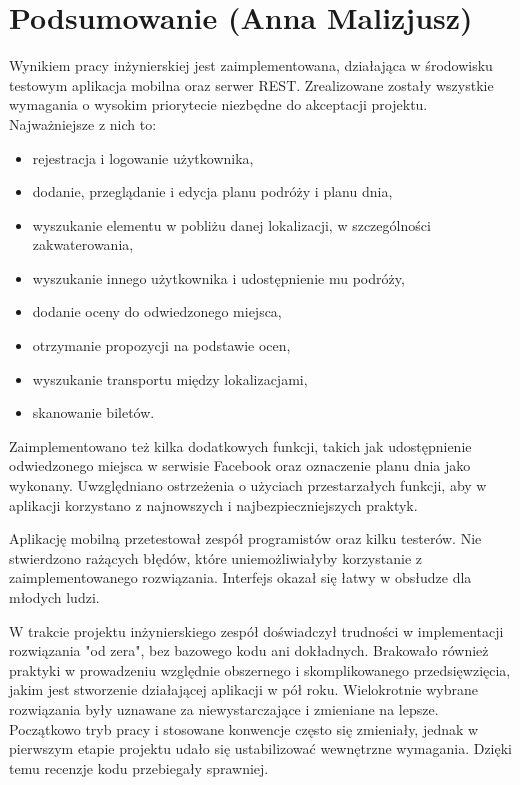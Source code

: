 \documentclass[10pt,twoside,a4paper]{report}
\begin{document}
\chapter{Podsumowanie (Anna Malizjusz)}

\par Wynikiem pracy inżynierskiej jest zaimplementowana, działająca w środowisku testowym aplikacja mobilna oraz serwer REST. Zrealizowane zostały wszystkie wymagania o wysokim priorytecie niezbędne do akceptacji projektu. Najważniejsze z nich to:
\begin{itemize}
\item rejestracja i logowanie użytkownika,
\item dodanie, przeglądanie i edycja planu podróży i planu dnia,
\item wyszukanie elementu w pobliżu danej lokalizacji, w szczególności zakwaterowania,
\item wyszukanie innego użytkownika i udostępnienie mu podróży,
\item dodanie oceny do odwiedzonego miejsca,
\item otrzymanie propozycji na podstawie ocen,
\item wyszukanie transportu między lokalizacjami,
\item skanowanie biletów.
\end{itemize}

\par Zaimplementowano też kilka dodatkowych funkcji, takich jak udostępnienie odwiedzonego miejsca w serwisie Facebook oraz oznaczenie planu dnia jako wykonany. Uwzględniano ostrzeżenia o użyciach przestarzałych funkcji, aby w aplikacji korzystano z najnowszych i najbezpieczniejszych praktyk.

\par Aplikację mobilną przetestował zespół programistów oraz kilku testerów. Nie stwierdzono rażących błędów, które uniemożliwiałyby korzystanie z zaimplementowanego rozwiązania. Interfejs okazał się łatwy w obsłudze dla młodych ludzi.

\par W trakcie projektu inżynierskiego zespół doświadczył trudności w implementacji rozwiązania "od zera", bez bazowego kodu ani dokładnych. Brakowało również praktyki w prowadzeniu względnie obszernego i skomplikowanego przedsięwzięcia, jakim jest stworzenie działającej aplikacji w pół roku. Wielokrotnie wybrane rozwiązania były uznawane za niewystarczające i zmieniane na lepsze. Początkowo tryb pracy i stosowane konwencje często się zmieniały, jednak w pierwszym etapie projektu udało się ustabilizować wewnętrzne wymagania. Dzięki temu recenzje kodu przebiegały sprawniej.
\end{document}
